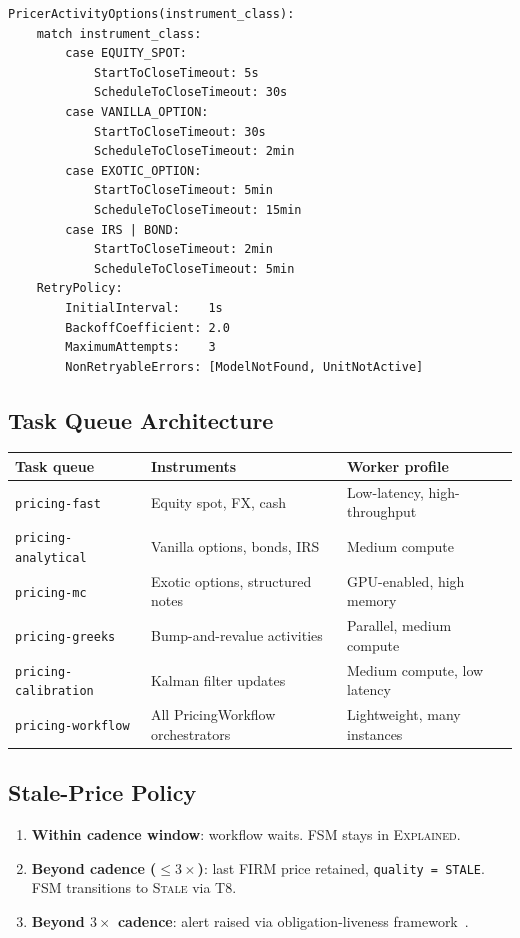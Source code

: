 \documentclass[11pt,a4paper]{article}
\begin{document}
\begin{lstlisting}
PricerActivityOptions(instrument_class):
    match instrument_class:
        case EQUITY_SPOT:
            StartToCloseTimeout: 5s
            ScheduleToCloseTimeout: 30s
        case VANILLA_OPTION:
            StartToCloseTimeout: 30s
            ScheduleToCloseTimeout: 2min
        case EXOTIC_OPTION:
            StartToCloseTimeout: 5min
            ScheduleToCloseTimeout: 15min
        case IRS | BOND:
            StartToCloseTimeout: 2min
            ScheduleToCloseTimeout: 5min
    RetryPolicy:
        InitialInterval:    1s
        BackoffCoefficient: 2.0
        MaximumAttempts:    3
        NonRetryableErrors: [ModelNotFound, UnitNotActive]
\end{lstlisting}

\subsection{Task Queue Architecture}

\begin{center}
\small
\begin{tabular}{l l l}
\toprule
\textbf{Task queue} & \textbf{Instruments} & \textbf{Worker profile} \\
\midrule
\texttt{pricing-fast} & Equity spot, FX, cash & Low-latency, high-throughput \\
\texttt{pricing-analytical} & Vanilla options, bonds, IRS & Medium compute \\
\texttt{pricing-mc} & Exotic options, structured notes & GPU-enabled, high memory \\
\texttt{pricing-greeks} & Bump-and-revalue activities & Parallel, medium compute \\
\texttt{pricing-calibration} & Kalman filter updates & Medium compute, low latency \\
\texttt{pricing-workflow} & All PricingWorkflow orchestrators & Lightweight, many instances \\
\bottomrule
\end{tabular}
\end{center}

\subsection{Stale-Price Policy}

\begin{enumerate}
\item \textbf{Within cadence window}: workflow waits.  FSM stays in \textsc{Explained}.
\item \textbf{Beyond cadence ($\leq 3\times$)}: last FIRM price retained, \texttt{quality = STALE}.  FSM transitions to \textsc{Stale} via T8.
\item \textbf{Beyond $3\times$ cadence}: alert raised via obligation-liveness framework~\cite[\S14.7]{ledger}.
\end{enumerate}
\end{document}
